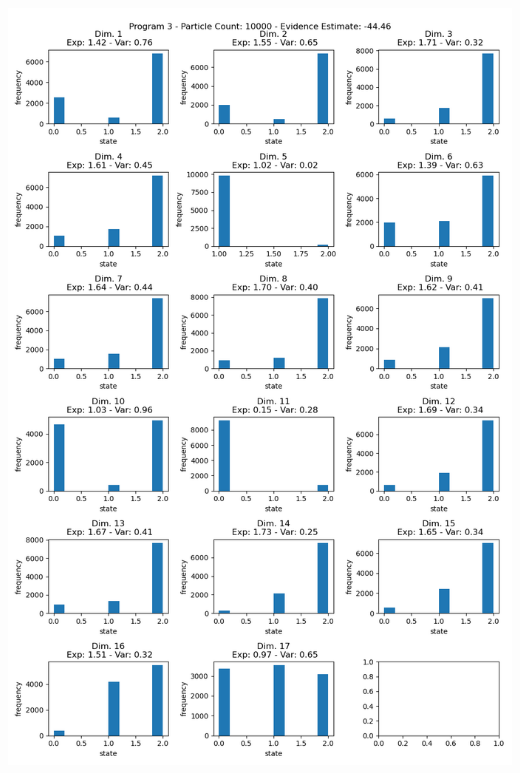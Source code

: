 \documentclass[10pt]{homeworg}
\begin{document}
\newpage
\begin{center}
\includegraphics[scale=0.5]{figures/program3/10000_particles.png}
\end{center}

\newpage
\end{document}
